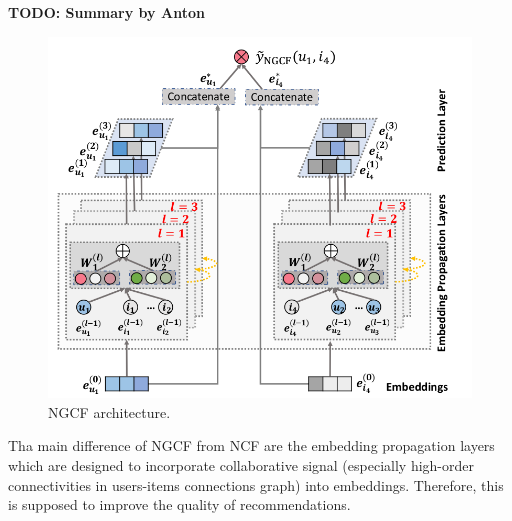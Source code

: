 \textbf{TODO: Summary by Anton}
\begin{figure}[h]
    \centering
    \includegraphics[width=0.8\linewidth]{images/ngcf.png}
    \caption{NGCF architecture.}
    \label{fig:ngcf}
\end{figure}

Tha main difference of NGCF from NCF are the embedding propagation layers which are 
designed to incorporate collaborative signal (especially high-order connectivities 
in users-items connections graph) into embeddings. Therefore, this is supposed to
improve the quality of recommendations.
